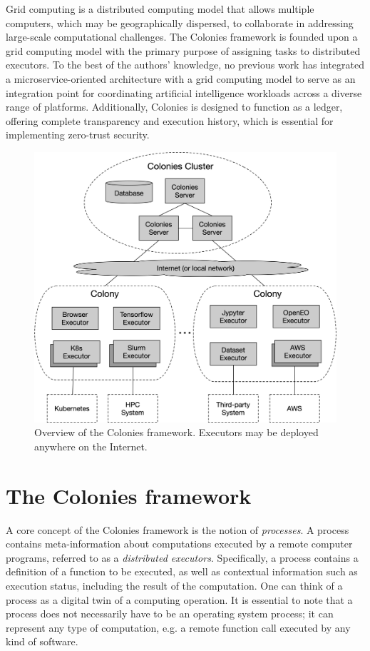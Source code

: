 \documentclass{article}
\begin{document}
Grid computing \cite{grid_computing} is a distributed computing model that allows multiple computers, which may be geographically dispersed, to collaborate in addressing large-scale computational challenges. The Colonies framework is founded upon a grid computing model with the primary purpose of assigning tasks to distributed executors. To the best of the authors' knowledge, no previous work has integrated a microservice-oriented architecture with a grid computing model to serve as an integration point for coordinating artificial intelligence workloads across a diverse range of platforms. Additionally, Colonies is designed to function as a ledger, offering complete transparency and execution history, which is essential for implementing zero-trust security.

\begin{figure}[h]
	\centering
    \includegraphics[scale=0.35]{overview.png}
	\caption{Overview of the Colonies framework. Executors may be deployed anywhere on the Internet.}
	\label{fig:overview}
\end{figure}

\section{The Colonies framework}
\label{sec:headings}
A core concept of the Colonies framework is the notion of \emph{processes}. A process contains meta-information about computations executed by a remote computer programs, referred to as a \emph{distributed executors}. Specifically, a process contains a definition of a function to be executed, as well as contextual information such as execution status, including the result of the computation. One can think of a process as a digital twin of a computing operation. It is essential to note that a process does not necessarily have to be an operating system process; it can represent any type of computation, e.g. a remote function call executed by any kind of software. 
\end{document}
